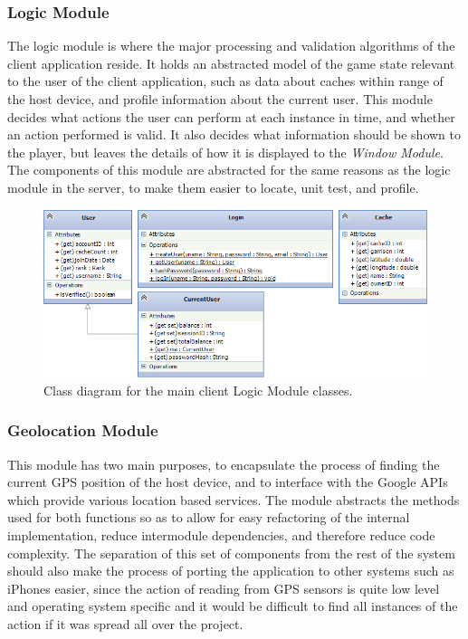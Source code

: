 \subsubsection{Logic Module}
The logic module is where the major processing and validation algorithms of the client application reside. It holds an abstracted model of the game state relevant to the user of the client application, such as data about caches within range of the host device, and profile information about the current user. This module decides what actions the user can perform at each instance in time, and whether an action performed is valid. It also decides what information should be shown to the player, but leaves the details of how it is displayed to the \emph{Window Module}. The components of this module are abstracted for the same reasons as the logic module in the server, to make them easier to locate, unit test, and profile.

\begin{figure}[h!]
    \centering
    \includegraphics[width=\textwidth]{cllogiccd}
    \caption{Class diagram for the main client Logic Module classes.}
    \label{fig:cllogicclasses}
\end{figure}

\subsubsection{Geolocation Module}
This module has two main purposes, to encapsulate the process of finding the current GPS position of the host device, and to interface with the Google APIs which provide various location based services. The module abstracts the methods used for both functions so as to allow for easy refactoring of the internal implementation, reduce intermodule dependencies, and therefore reduce code complexity. The separation of this set of components from the rest of the system should also make the process of porting the application to other systems such as iPhones easier, since the action of reading from GPS sensors is quite low level and operating system specific and it would be difficult to find all instances of the action if it was spread all over the project.

